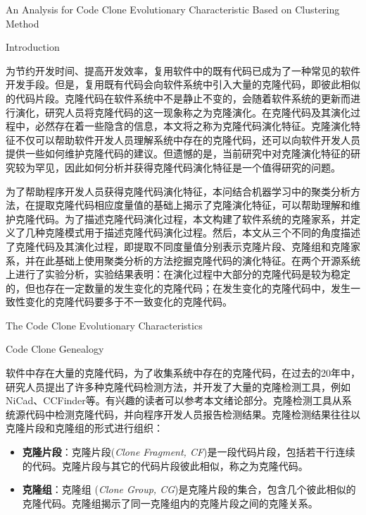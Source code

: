 
{An Analysis for Code Clone Evolutionary Characteristic Based on Clustering Method}

{Introduction}

为节约开发时间、提高开发效率，复用软件中的既有代码已成为了一种常见的软件开发手段。但是，复用既有代码会向软件系统中引入大量的克隆代码，即彼此相似的代码片段。克隆代码在软件系统中不是静止不变的，会随着软件系统的更新而进行演化，研究人员将克隆代码的这一现象称之为克隆演化。在克隆代码及其演化过程中，必然存在着一些隐含的信息，本文将之称为克隆代码演化特征。克隆演化特征不仅可以帮助软件开发人员理解系统中存在的克隆代码，还可以向软件开发人员提供一些如何维护克隆代码的建议。但遗憾的是，当前研究中对克隆演化特征的研究较为罕见，因此如何分析并获得克隆代码演化特征是一个值得研究的问题。

为了帮助程序开发人员获得克隆代码演化特征，本问结合机器学习中的聚类分析方法，在提取克隆代码相应度量值的基础上揭示了克隆演化特征，可以帮助理解和维护克隆代码。为了描述克隆代码演化过程，本文构建了软件系统的克隆家系，并定义了几种克隆模式用于描述克隆代码演化过程。然后，本文从三个不同的角度描述了克隆代码及其演化过程，即提取不同度量值分别表示克隆片段、克隆组和克隆家系，并在此基础上使用聚类分析的方法挖掘克隆代码的演化特征。在两个开源系统上进行了实验分析，实验结果表明：在演化过程中大部分的克隆代码是较为稳定的，但也存在一定数量的发生变化的克隆代码；在发生变化的克隆代码中，发生一致性变化的克隆代码要多于不一致变化的克隆代码。

{The Code Clone Evolutionary Characteristics}

{Code Clone Genealogy}

软件中存在大量的克隆代码，为了收集系统中存在的克隆代码，在过去的20年中，研究人员提出了许多种克隆代码检测方法，并开发了大量的克隆检测工具，例如NiCad\cite{roy2008nicad}、CCFinder\cite{kamiya2002ccfinder}等。有兴趣的读者可以参考本文绪论部分。克隆检测工具从系统源代码中检测克隆代码，并向程序开发人员报告检测结果。克隆检测结果往往以克隆片段和克隆组的形式进行组织：

\begin{itemize}
\item 
\textbf{克隆片段}：克隆片段(\emph{Clone Fragment, CF})是一段代码片段，包括若干行连续的代码。克隆片段与其它的代码片段彼此相似，称之为克隆代码。
\item
\textbf{克隆组}：克隆组 (\emph{Clone Group, CG})是克隆片段的集合，包含几个彼此相似的克隆代码。克隆组揭示了同一克隆组内的克隆片段之间的克隆关系。
\end{itemize}


